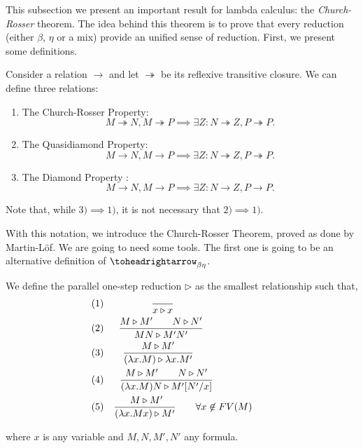 This subsection we present an important result for lambda calculus: the \emph{Church-Rosser} theorem. The idea behind this theorem is to prove that every reduction (either $\beta$, $\eta$ or a mix) provide an unified sense of reduction. First, we present some definitions.

\begin{definition}
  Consider a relation $\to$ and let $\twoheadrightarrow$ be its reflexive transitive closure. We can define three relations:

\begin{enumerate}
  \item The Church-Rosser Property: $$M\twoheadrightarrow N, M\twoheadrightarrow P \implies \exists Z : N\twoheadrightarrow Z, P\twoheadrightarrow P.$$
  \item The Quasidiamond Property: $$M\to N, M\to P \implies \exists Z : N\twoheadrightarrow Z, P\twoheadrightarrow P.$$
  \item The Diamond Property : $$M\to N, M\to P \implies \exists Z : N\to Z,P\to P.$$
  \end{enumerate}
\end{definition}

\begin{remark} 
  Note that, while $3)\implies 1)$, it is not necessary that $2)\implies 1)$.
\end{remark}


With this notation, we introduce the Church-Rosser Theorem, proved as done by Martin-Löf. We are going to need some tools. The first one is going to be an alternative definition of $\toheadrightarrow_{\beta\eta}$.
\begin{definition}
  We define the parallel one-step reduction  $\triangleright$ as the smallest relationship such that,\\
\begin{align*}
(1)&& {\displaystyle \over x \triangleright x}\qquad\qquad\qquad\qquad\qquad\\
 (2)&& { M \triangleright M'\qquad N\triangleright N'  \over MN \triangleright M'N' }\qquad\qquad\qquad\ \  \ \\
 (3)&&{M \triangleright M' \over(\lambda x.M) \triangleright \lambda x.M'}\qquad\qquad\qquad\qquad\\
 (4)&& {M \triangleright M'\qquad N \triangleright N' \over (\lambda x.M)N \triangleright M'[N'/x]}\qquad\qquad\qquad\\
  (5)&& {\ M\triangleright M'\over(\lambda x.Mx) \triangleright M'} \qquad \forall x \not  \in FV(M)\qquad
\end{align*}



where $x$ is any variable and $M,N,M',N'$ any formula.
\end{definition}

